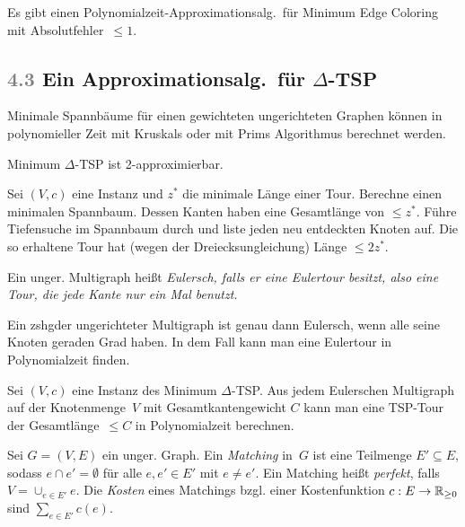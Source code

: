 \documentclass{cheat-sheet}
\newcommand{\Problem}[1]{\textcolor{ProblemColor}{\textbf{#1}}}
\newcommand{\scriptSection}[1]{\textcolor{gray}{#1}\enspace}
\begin{document}
\begin{kor}
  Es gibt einen Polynomialzeit-Approximationsalg.\ für Minimum Edge Coloring mit Absolutfehler~$\leq 1$.
\end{kor}

\subsection{\scriptSection{4.3} Ein Approximationsalg.\ für \Problem{$\Delta$-TSP}}

\begin{erinnerung}
  Minimale Spannbäume für einen gewichteten ungerichteten Graphen können in polynomieller Zeit mit Kruskals oder mit Prims Algorithmus berechnet werden.
\end{erinnerung}

\begin{satz}
  Minimum $\Delta$-TSP ist 2-approximierbar.
\end{satz}

\begin{beweisskizze}
  Sei $(V, c)$ eine Instanz und $z^*$ die minimale Länge einer Tour.
  Berechne einen minimalen Spannbaum.
  Dessen Kanten haben eine Gesamtlänge von $\leq z^*$.
  Führe Tiefensuche im Spannbaum durch und liste jeden neu entdeckten Knoten auf.
  Die so erhaltene Tour hat (wegen der Dreiecksungleichung) Länge $\leq 2 z^*$.
\end{beweisskizze}

\begin{defn}
  Ein unger. Multigraph heißt \em{Eulersch}, falls er eine \textit{Eulertour} besitzt, also eine Tour, die jede Kante nur ein Mal benutzt.
\end{defn}

\begin{lem}
  Ein zshgder ungerichteter Multigraph ist genau dann Eulersch, wenn alle seine Knoten geraden Grad haben.
  In dem Fall kann man eine Eulertour in Polynomialzeit finden.
\end{lem}

\begin{lem}
  Sei $(V, c)$ eine Instanz des Minimum $\Delta$-TSP.
  Aus jedem Eulerschen Multigraph auf der Knotenmenge~$V$ mit Gesamtkantengewicht $C$ kann man eine TSP-Tour der Gesamtlänge~$\leq C$ in Polynomialzeit berechnen.
\end{lem}

\begin{defn}
  Sei $G = (V, E)$ ein unger. Graph.
  Ein \emph{Matching} in~$G$ ist eine Teilmenge $E' \subseteq E$, sodass $e \cap e' = \emptyset$ für alle $e, e' \in E'$ mit $e \neq e'$.
  Ein Matching heißt \emph{perfekt}, falls $V = \cup_{e \in E'} e$.
  Die \textit{Kosten} eines Matchings bzgl. einer Kostenfunktion $c : E \to \mathbb{R}_{\geq 0}$ sind ${\sum}_{e \in E'} c(e)$.
\end{defn}
\end{document}
